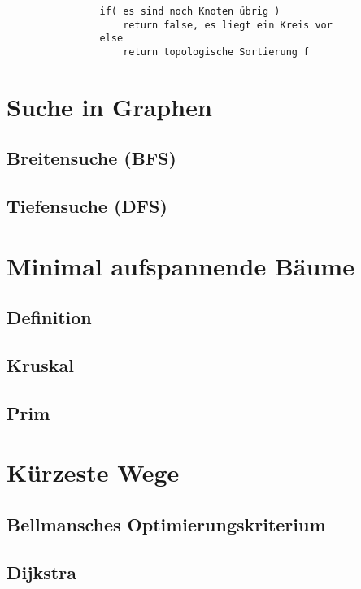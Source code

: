 \documentclass[10pt,a4paper,landscape]{article}
\begin{document}
\begin{multicols*}{3}
\begin{verbatim}
                if( es sind noch Knoten übrig )
                    return false, es liegt ein Kreis vor
                else 
                    return topologische Sortierung f
            \end{verbatim}

        \section{ Suche in Graphen }
            \subsection{ Breitensuche (BFS) }

            \subsection{ Tiefensuche (DFS) }


        \section{ Minimal aufspannende Bäume }
            \subsection{ Definition } 

            \subsection{ Kruskal }

            \subsection{ Prim }


        \section{ Kürzeste Wege }
            \subsection{ Bellmansches Optimierungskriterium }

            \subsection{ Dijkstra }


\end{multicols*}
\end{document}
